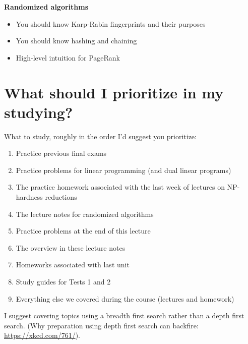 \documentclass[11  pt]{exam}
\begin{document}
\textbf{Randomized algorithms}
\begin{itemize}
	\item You should know Karp-Rabin fingerprints and their purposes
	\item You should know hashing and chaining
	\item High-level intuition for PageRank
\end{itemize}

\newpage
\section{What should I prioritize in my studying?}
What to study, roughly in the order I'd suggest you prioritize:
\begin{enumerate}
	\item Practice previous final exams
  \item Practice problems for linear programming (and dual linear programs)
	\item The practice homework associated with the last week of lectures on NP-hardness reductions
	\item The lecture notes for randomized algorithms
	\item Practice problems at the end of this lecture
	\item The overview in these lecture notes
	\item Homeworks associated with last unit
	\item Study guides for Tests 1 and 2
	\item Everything else we covered during the course (lectures and homework)
\end{enumerate}

I suggest covering topics using a breadth first search rather than a depth first search. (Why preparation using depth first search can backfire: \url{https://xkcd.com/761/}).

\newpage


	
\end{document}
